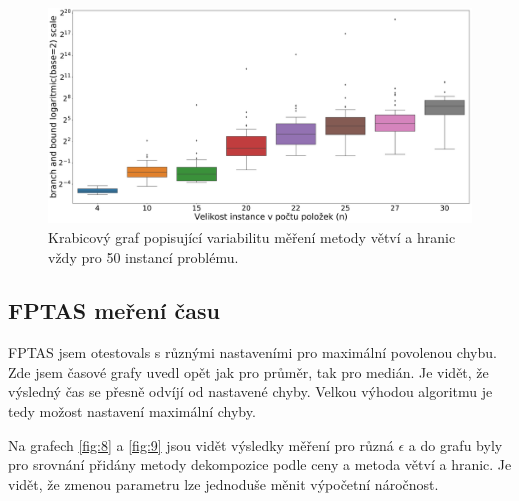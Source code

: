 \documentclass[11pt]{article}
\begin{document}
\begin{figure}[h]\centering
	\includegraphics[scale=0.2]{img/boxBB}
 	\caption[2]{Krabicový graf popisující variabilitu měření metody větví a hranic vždy pro 50 instancí problému.}\label{fig:7}
 \end{figure} 	

\subsection{FPTAS meření času}

FPTAS jsem otestovals s různými nastaveními pro maximální povolenou chybu. Zde jsem časové grafy uvedl opět jak pro průměr, tak pro medián. Je vidět, že výsledný čas se přesně odvíjí od nastavené chyby. Velkou výhodou algoritmu je tedy možost nastavení maximální chyby.

Na grafech \ref{fig:8} a \ref{fig:9} jsou vidět výsledky měření pro různá $\epsilon$ a do grafu byly pro srovnání přidány metody dekompozice podle ceny a metoda větví a hranic. Je vidět, že zmenou parametru lze jednoduše měnit výpočetní náročnost.
\end{document}
